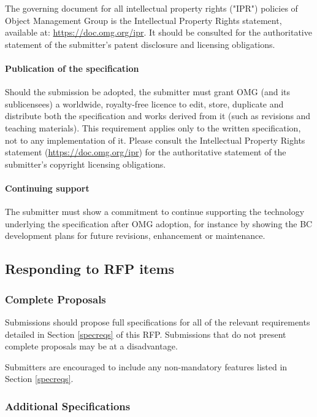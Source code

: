 The governing document for all intellectual property rights ("IPR") policies of Object Management Group is the Intellectual Property Rights statement, available at: \url{https://doc.omg.org/ipr}. It should be consulted for the authoritative statement of the submitter's patent disclosure and licensing obligations.


\paragraph{Publication of the specification}

Should the submission be adopted, the submitter must grant OMG (and its sublicensees) a worldwide, royalty-free licence to edit, store, duplicate and distribute both the specification and works derived from it (such as revisions and teaching materials). This requirement applies only to the written specification, not to any implementation of it. Please consult the Intellectual Property Rights statement (\url{https://doc.omg.org/ipr}) for the authoritative statement of the submitter's copyright licensing obligations.


\paragraph{Continuing support}

The submitter must show a commitment to continue supporting the technology underlying the specification after OMG adoption, for instance by showing the BC development plans for future revisions, enhancement or maintenance.


\subsection{Responding to RFP items}
\subsubsection{Complete Proposals}

Submissions should propose full specifications for all of the relevant requirements detailed in Section \ref{specreqs} of this RFP. Submissions that do not present complete proposals may be at a disadvantage.

Submitters are encouraged to include any non-mandatory features listed in Section \ref{specreqs}.


\subsubsection{Additional Specifications}

